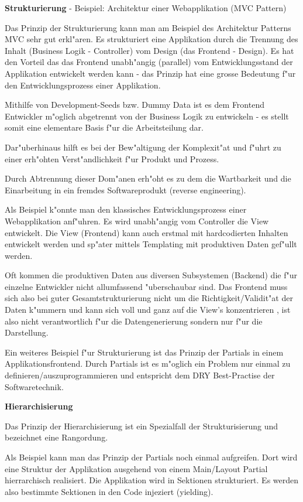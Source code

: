 \textbf{Strukturierung}
- Beispiel: Architektur einer Webapplikation (MVC Pattern)

Das Prinzip der Strukturierung kann man am Beispiel des Architektur Patterns MVC sehr gut erkl"aren.
Es strukturiert eine Applikation durch die Trennung des Inhalt (Business Logik - Controller) vom Design (das Frontend - Design).
Es hat den Vorteil das das Frontend unabh"angig (parallel) vom Entwicklungsstand der Applikation entwickelt werden kann - das Prinzip hat eine grosse Bedeutung f"ur den Entwicklungsprozess einer Applikation.

Mithilfe von Development-Seeds bzw. Dummy Data ist es dem Frontend Entwickler m"oglich abgetrennt von der Business Logik zu entwickeln - es stellt somit eine elementare Basis f"ur die Arbeitsteilung dar.

Dar"uberhinaus hilft es bei der Bew"altigung der Komplexit"at und f"uhrt zu einer erh"ohten Verst"andlichkeit f"ur Produkt und Prozess.

Durch Abtrennung dieser Dom"anen erh"oht es zu dem die Wartbarkeit und die Einarbeitung in ein fremdes Softwareprodukt (reverse engineering).

Als Beispiel k"onnte man den klassisches Entwicklungsprozess einer Webapplikation anf"uhren. Es wird unabh"angig vom Controller die View entwickelt.
Die View (Frontend) kann auch erstmal mit hardcodierten Inhalten entwickelt werden und sp"ater mittels Templating mit produktiven Daten gef"ullt werden.

Oft kommen die produktiven Daten aus diversen Subsystemen (Backend) die f"ur einzelne Entwickler nicht allumfassend "uberschaubar sind.
Das Frontend muss sich also bei guter Gesamtstrukturierung nicht um die Richtigkeit/Validit"at der Daten k"ummern und kann sich voll und ganz auf die View's konzentrieren , ist also nicht verantwortlich f"ur die Datengenerierung sondern nur f"ur die Darstellung.

Ein weiteres Beispiel f"ur Strukturierung ist das Prinzip der Partials in einem Applikationsfrontend. Durch Partials ist es m"oglich ein Problem nur einmal zu definieren/auszuprogrammieren und entspricht dem DRY Best-Practise der Softwaretechnik.

\textbf{Hierarchisierung}

Das Prinzip der Hierarchisierung ist ein Spezialfall der Strukturisierung und bezeichnet eine Rangordung.

Als Beispiel kann man das Prinzip der Partials noch einmal aufgreifen. Dort wird eine Struktur der Applikation ausgehend von einem Main/Layout Partial hierrarchisch realisiert.
Die Applikation wird in Sektionen strukturiert. Es werden also bestimmte Sektionen in den Code injeziert (yielding).

